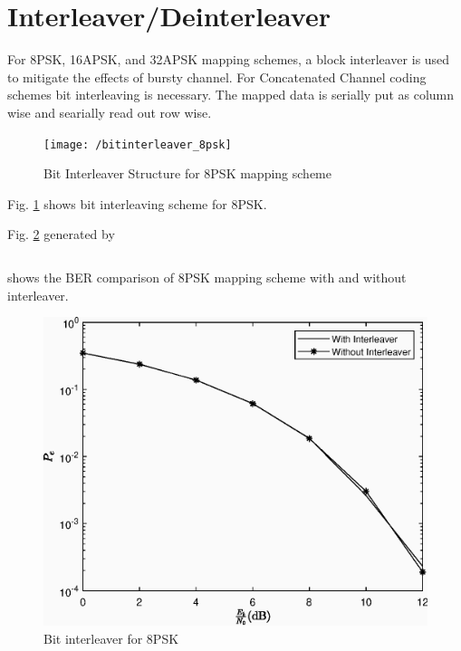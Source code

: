 \documentclass[journal,12pt,twocolumn]{IEEEtran}
\begin{document}
\section{Interleaver/Deinterleaver}
For 8PSK, 16APSK, and 32APSK mapping schemes, a
block interleaver  \cite{dvb} is used to mitigate the effects of bursty channel. For Concatenated Channel coding schemes bit interleaving is necessary. The mapped data is serially put as column wise and searially read out row wise. 
%
\begin{figure}[!ht]
\begin{center}
\texttt{[image: /bitinterleaver\_8psk]}
\end{center}
\caption{Bit Interleaver Structure for 8PSK mapping scheme}
\label{fig:bit8psk}
\end{figure}
Fig. \ref{fig:bit8psk} shows bit interleaving scheme for 8PSK.


Fig. \ref{fig:inter} generated by 
%
\begin{lstlisting}
\end{lstlisting}
%

shows the BER comparison of 8PSK mapping scheme with  and without interleaver. 
\begin{figure}[!ht]
\begin{center}
\includegraphics[width=\columnwidth]{./figs/Interleaver.eps}
\end{center}
\caption{Bit interleaver for 8PSK}
\label{fig:inter}
\end{figure}
\end{document}

